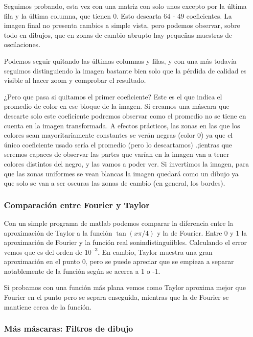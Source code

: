 		Seguimos probando, esta vez con una matriz con solo unos excepto por la última fila y la última columna, que tienen 0. Esto descarta 64 - 49 coeficientes. La imagen final no presenta cambios a simple vista, pero podemos observar, sobre todo en dibujos, que en zonas de cambio abrupto hay pequeñas muestras de oscilaciones.


		Podemos seguir quitando las últimas columnas y filas, y con una más todavía seguimos distinguiendo la imagen bastante bien solo que la pérdida de calidad es visible al hacer zoom y comprobar el resultado.

		¿Pero que pasa si quitamos el primer coeficiente? Este es el que indica el promedio de color en ese bloque de la imagen. Si creamos una máscara que descarte solo este coeficiente podremos observar como el promedio no se tiene en cuenta en la imagen transformada. A efectos prácticos, las zonas en las que los colores sean mayoritariamente constantes se verán negras (color 0) ya que el único coeficiente usado sería el promedio (pero lo descartamos) .;ientras que seremos capaces de observar las partes que varían en la imagen van a tener colores distintos del negro, y las vamos a poder ver. Si invertimos la imagen, para que las zonas uniformes se vean blancas la imagen quedará como un dibujo ya que solo se van a ser oscuras las zonas de cambio (en general, los bordes).

	\subsubsection{Comparación entre Fourier y Taylor}

		Con un simple programa de matlab podemos comparar la diferencia entre la aproximación de Taylor a la función $\tan(x \pi/4)$ y la de Fourier. Entre 0 y 1 la aproximación de Fourier y la función real sonindistinguiibles. Calculando el error vemos que es del orden de $10^{-3}$. En cambio, Taylor muestra una gran aproximación en el punto 0, pero se puede apreciar que se empieza a separar notablemente de la función según se acerca a 1 o -1.

		Si probamos con una función más plana vemos como Taylor aproxima mejor que Fourier en el punto pero se separa enseguida, mientras que la de Fourier se mantiene cerca de la función.

	\subsubsection{Más máscaras: Filtros de dibujo}

